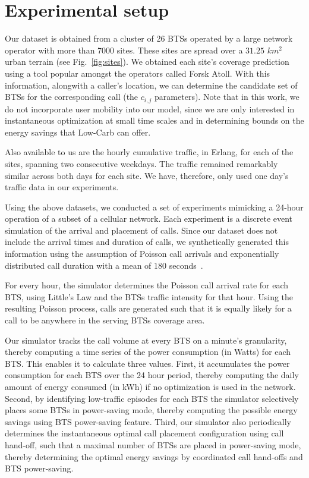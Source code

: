 \section{Experimental setup} 
\label{sec:case2:experiments} Our dataset is obtained from a cluster of 26 BTSs operated by a large network operator with more than 7000 sites. These sites are spread over a $31.25$ $km^2$ urban terrain (see Fig.~\ref{fig:sites}). We obtained each site's coverage prediction using a tool popular amongst the operators called Forsk Atoll. With this information, alongwith a caller's location, we can determine the candidate set of BTSs for the corresponding call (the $c_{i,j}$ parameters). Note that in this work, we do not incorporate user mobility into our model, since we are only interested in instantaneous optimization at small time scales and in determining bounds on the energy savings that Low-Carb can offer.

Also available to us are the hourly cumulative traffic, in Erlang, for each of the sites, spanning two consecutive weekdays. The traffic remained remarkably similar across both days for each site. We have, therefore, only used one day's traffic data in our experiments.

Using the above datasets, we conducted a set of experiments mimicking a 24-hour operation of a subset of a cellular network. Each experiment is a discrete event simulation of the arrival and placement of calls. Since our dataset does not include the arrival times and duration of calls, we synthetically generated this information using the assumption of Poisson call arrivals and exponentially distributed call duration with a mean of $180$ seconds~\cite{Gerla:1995:MMM:276418.276421}.

For every hour, the simulator determines the Poisson call arrival rate for each BTS, using Little's Law and the BTSs traffic intensity for that hour. Using the resulting Poisson process, calls are generated such that it is equally likely for a call to be anywhere in the serving BTSs coverage area.

Our simulator tracks the call volume at every BTS on a minute's granularity, thereby computing a time series of the power consumption (in Watts) for each BTS. This enables it to calculate three values. First, it accumulates the power consumption for each BTS over the 24 hour period, thereby computing the daily amount of energy consumed (in kWh) if no optimization is used in the network. Second, by identifying low-traffic episodes for each BTS the simulator selectively places some BTSs in power-saving mode, thereby computing the possible energy savings using BTS power-saving feature. Third, our simulator also periodically determines the instantaneous optimal call placement configuration using call hand-off, such that a maximal number of BTSs are placed in power-saving mode, thereby determining the optimal energy savings by coordinated call hand-offs and BTS power-saving.

